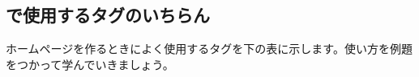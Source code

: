 \documentclass[text01.tex]{subfiles}
\begin{document}
\begin{tcolorbox}[title=\useOmetoi,breakable]
  \begin{enumerate}
  \end{enumerate}
\end{tcolorbox}
\clearpage




%
%
\subsection{で使用するタグのいちらん}

ホームページを作るときによく使用するタグを下の表に示します。使い方を例題をつかって学んでいきましょう。
\end{document}

